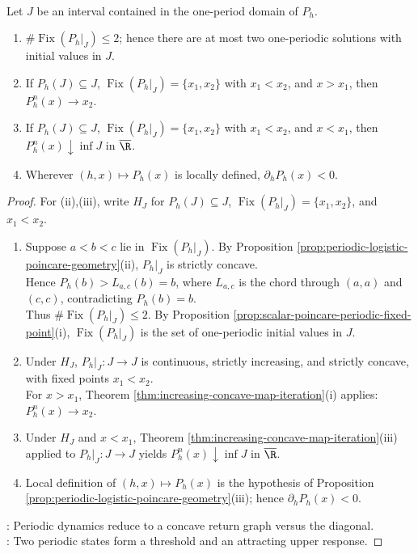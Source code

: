 \begin{corollary} \label{cor:periodic-logistic-fixed-point-structure} \\
Let $J$ be an interval contained in the one-period domain of $P_h$.
\begin{enumerate}[label=(\roman*)]
\setlength{\itemsep}{0pt}
\item $\#\operatorname{Fix}(P_h|_J)\leq2$; hence there are at most two one-periodic solutions with initial values in $J$.
\item If $P_h(J)\subseteq J$, $\operatorname{Fix}(P_h|_J)=\{x_1,x_2\}$ with $x_1<x_2$, and $x>x_1$, then $P_h^n(x)\to x_2$.
\item If $P_h(J)\subseteq J$, $\operatorname{Fix}(P_h|_J)=\{x_1,x_2\}$ with $x_1<x_2$, and $x<x_1$, then $P_h^n(x)\downarrow\inf J$ in $\overline{\R}$.
\item Wherever $(h,x)\mapsto P_h(x)$ is locally defined, $\partial_hP_h(x)<0$.
\end{enumerate}
\begin{proof}
For (ii),(iii), write $H_J$ for $P_h(J)\subseteq J$, $\operatorname{Fix}(P_h|_J)=\{x_1,x_2\}$, and $x_1<x_2$.
\begin{enumerate}[label=(\roman*)]
\setlength{\itemsep}{0pt}
\item Suppose $a<b<c$ lie in $\operatorname{Fix}(P_h|_J)$. By Proposition \ref{prop:periodic-logistic-poincare-geometry}(ii), $P_h|_J$ is strictly concave.\\
Hence $P_h(b)>L_{a,c}(b)=b$, where $L_{a,c}$ is the chord through $(a,a)$ and $(c,c)$, contradicting $P_h(b)=b$.\\
Thus $\#\operatorname{Fix}(P_h|_J)\leq2$. By Proposition \ref{prop:scalar-poincare-periodic-fixed-point}(i), $\operatorname{Fix}(P_h|_J)$ is the set of one-periodic initial values in $J$.
\item Under $H_J$, $P_h|_J:J\to J$ is continuous, strictly increasing, and strictly concave, with fixed points $x_1<x_2$.\\
For $x>x_1$, Theorem \ref{thm:increasing-concave-map-iteration}(i) applies: $P_h^n(x)\to x_2$.
\item Under $H_J$ and $x<x_1$, Theorem \ref{thm:increasing-concave-map-iteration}(iii) applied to $P_h|_J:J\to J$ yields $P_h^n(x)\downarrow\inf J$ in $\overline{\R}$.
\item Local definition of $(h,x)\mapsto P_h(x)$ is the hypothesis of Proposition \ref{prop:periodic-logistic-poincare-geometry}(iii); hence $\partial_hP_h(x)<0$.
\end{enumerate}
: Periodic dynamics reduce to a concave return graph versus the diagonal.\\
: Two periodic states form a threshold and an attracting upper response.
\end{proof}
\end{corollary}
